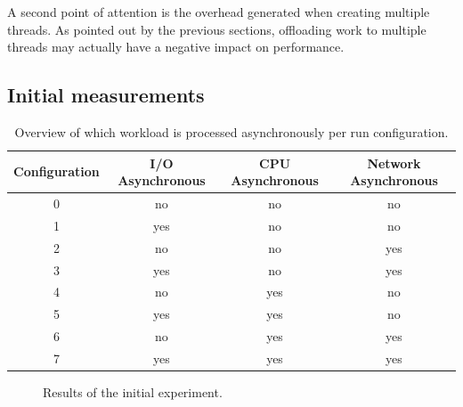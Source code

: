 A second point of attention is the overhead generated when creating multiple threads.
As pointed out by the previous sections, offloading work to multiple threads may actually have a negative impact on performance.

\subsection{Initial measurements}

\begin{table}[]
	\centering
	\begin{tabular}{|c|c|c|c|}
		\hline
		\textbf{Configuration}	& \textbf{I/O Asynchronous} & \textbf{CPU Asynchronous} & \textbf{Network Asynchronous} \\ \hline
		0	& no & no & no \\ \hline
		1	& yes & no & no \\ \hline
		2	& no & no & yes \\ \hline
		3	& yes & no & yes \\ \hline
		4	& no & yes & no \\ \hline
		5	& yes & yes & no \\ \hline
		6	& no & yes & yes \\ \hline
		7	& yes & yes & yes \\ \hline
	\end{tabular}
	\caption{Overview of which workload is processed asynchronously per run configuration.}
	\label{tbl:experiment_configuration}
\end{table}

\begin{figure}[h]
	\caption{Results of the initial experiment.}
	\label{fig:initial_results}
\end{figure}

